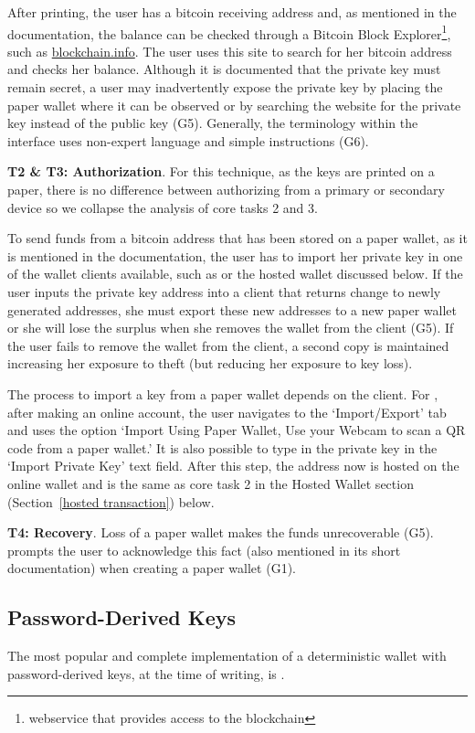 After printing, the user has a bitcoin receiving address and, as mentioned in the documentation, the balance can be checked through a Bitcoin Block Explorer\footnote{webservice that provides access to the blockchain}, such as \url{blockchain.info}. The user uses this site to search for her bitcoin address and checks her balance. Although it is documented that the private key must remain secret, a user may inadvertently expose the private key by placing the paper wallet where it can be observed or by searching the website for the private key instead of the public key (G5). Generally, the terminology within the \paper interface uses non-expert language and simple instructions (G6).

\textbf{T2 \& T3: Authorization}.
For this technique, as the keys are printed on a paper, there is no difference between authorizing from a primary or secondary device so we collapse the analysis of core tasks 2 and 3.
 
To send funds from a bitcoin address that has been stored on a paper wallet, as it is mentioned in the documentation, the user has to import her private key in one of the wallet clients available, such as \armory or the \block hosted wallet discussed below. If the user inputs the private key address into a client that returns change to newly generated addresses, she must export these new addresses to a new paper wallet or she will lose the surplus when she removes the wallet from the client (G5). If the user fails to remove the wallet from the client, a second copy is maintained increasing her exposure to theft (but reducing her exposure to key loss). 

The process to import a key from a paper wallet depends on the client. For \block, after making an online account, the user navigates to the `Import/Export' tab and uses the option `Import Using Paper Wallet, Use your Webcam to scan a QR code from a paper wallet.' It is also possible to type in the private key in the `Import Private Key' text field. After this step, the address now is hosted on the online wallet and is the same as core task 2 in the Hosted Wallet section (Section~\ref{hosted transaction}) below.

\textbf{T4: Recovery}.
Loss of a paper wallet makes the funds unrecoverable (G5). \paper prompts the user to acknowledge this fact (also mentioned in its short documentation) when creating a paper wallet (G1).

\subsection{Password-Derived Keys} The most popular and complete implementation of a deterministic wallet with password-derived keys, at the time of writing, is \brain.

